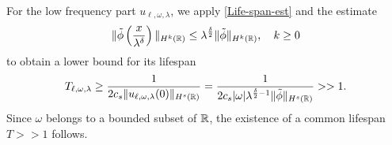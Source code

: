 %
%
For the low frequency part $u_{\ell, \omega, \lambda}$, we apply \eqref{Life-span-est} and the estimate
%
%
\begin{equation}
\begin{split}
	\label{tildphi}
\|\tilde{\phi}\left( \frac{x}{\lambda^\delta}
\right)\|_{H^{k}(\mathbb{R})} \le
\lambda^{\frac{\delta}{2}}\|\tilde{\phi}\|_{H^{k}(\mathbb{R})},
\quad k\ge 0
\end{split}
\end{equation}
%
%
to obtain a lower bound for its lifespan
%
\begin{equation*}
	\label{lifespan-bound-1}
	\begin{split}
		T_{\ell, \omega,\lambda} \ge \frac{1}{2 c_s \|u_{\ell, \omega, \lambda}(0)\|_{H^s(\mathbb{R})}} = 
		\frac{1}{2 c_s |\omega|
		\lambda^{\frac{\delta}{2}-1}\|\tilde{\phi}\|_{H^s(\mathbb{R})}} >> 1.
	\end{split}
\end{equation*}
%
%
Since $\omega$ belongs to a bounded subset of $\mathbb{R}$, the existence of a 
common lifespan $T >> 1$ follows. 
%
%

